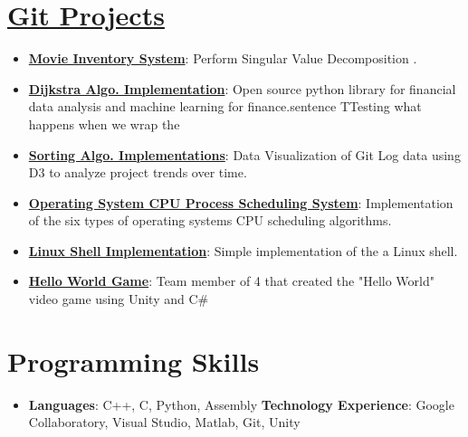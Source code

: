 \documentclass[letterpaper,11pt]{article}
\newcommand{\resumeItem}[2]{
  \item\small{
    \textbf{#1}{: #2 \vspace{-2pt}}
  }
}
\newcommand{\resumeSubItem}[2]{\resumeItem{#1}{#2}\vspace{-4pt}}
\newcommand{\resumeSubHeadingListStart}{\begin{itemize}[leftmargin=*]}
\newcommand{\resumeSubHeadingListEnd}{\end{itemize}}
\begin{document}
\section{\href{https://github.com/MarkWMavis}{Git Projects}}
  \resumeSubHeadingListStart
    \resumeSubItem{\href{https://github.com/MarkWMavis/CSS_343/tree/main/Assignment04}{Movie Inventory System}}
      {Perform Singular Value Decomposition .}
    \resumeSubItem{\href{https://github.com/MarkWMavis/CSS_343/tree/main/Assignment03}{Dijkstra Algo. Implementation}}
      {Open source python library for financial data analysis and machine learning for finance.sentence TTesting what happens when we wrap the }
    \resumeSubItem{\href{https://github.com/MarkWMavis/CSS_342/tree/main/Assignment04}{Sorting Algo. Implementations}}
      {Data Visualization of Git Log data using D3 to analyze project trends over time.}
    \resumeSubItem{\href{https://github.com/MarkWMavis/CSS_430/tree/main/Homework/Program03}{Operating System CPU Process Scheduling System}}
      {Implementation of the six types of operating systems CPU scheduling algorithms.}
    \resumeSubItem{\href{https://github.com/MarkWMavis/CSS_430/tree/main/Homework/Program01}{Linux Shell Implementation}}
      {Simple implementation of the a Linux shell.}
    \resumeSubItem{\href{https://sagewalsh.github.io/385Assignments/HelloWorld/}{Hello World Game}}
      {Team member of 4 that created the "Hello World" video game using Unity and C#}
  \resumeSubHeadingListEnd
  
\section{Programming Skills}
 \resumeSubHeadingListStart
   \item{
     \textbf{Languages}{: C++, C, Python, Assembly}
     \hfill
     \textbf{Technology Experience}{: Google Collaboratory, Visual Studio, Matlab, Git, Unity}
   }
 \resumeSubHeadingListEnd


\end{document}
